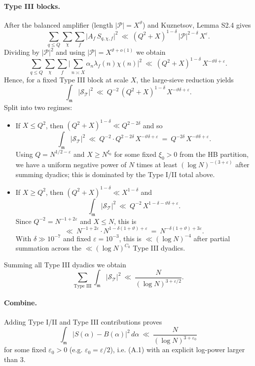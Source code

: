 \documentclass[11pt]{article}
\theoremstyle{definition}
\theoremstyle{remark}
\begin{document}
\paragraph{Type III blocks.} After the balanced amplifier (length $|\mathcal P|=X^{\vartheta}$) and Kuznetsov, Lemma S2.4 gives
\[
	\sum_{q\le Q}\sum_{\chi}\sum_f\big|A_f\,S_{q,\chi,f}\big|^2\ \ll\ (Q^2+X)^{1-\delta}\,|\mathcal P|^{2-\delta}\,X^{\varepsilon}.
\]
Dividing by $|\mathcal P|^2$ and using $|\mathcal P|=X^{\vartheta+o(1)}$ we obtain
\[
	\sum_{q\le Q}\sum_{\chi}\sum_f\Big|\sum_{n\asymp X}\alpha_n\lambda_f(n)\chi(n)\Big|^2\ \ll\ (Q^2+X)^{1-\delta}\,X^{-\vartheta\delta+\varepsilon}.
\]
Hence, for a fixed Type III block at scale $X$, the large-sieve reduction yields
\[
	\int_{\mathfrak m}|\mathcal S_{\mathcal T}|^2\ \ll\ Q^{-2}\,(Q^2+X)^{1-\delta}\,X^{-\vartheta\delta+\varepsilon}.
\]
Split into two regimes:
\begin{itemize}
	\item If $X\le Q^2$, then $(Q^2+X)^{1-\delta}\ll Q^{2-2\delta}$ and so
	      \[
		      \int_{\mathfrak m}|\mathcal S_{\mathcal T}|^2\ \ll\ Q^{-2}\cdot Q^{2-2\delta}\,X^{-\vartheta\delta+\varepsilon}\ =\ Q^{-2\delta}\,X^{-\vartheta\delta+\varepsilon}.
	      \]
	      Using $Q=N^{1/2-\varepsilon}$ and $X\ge N^{\xi_0}$ for some fixed $\xi_0>0$ from the HB partition, we have a uniform negative power of $N$ times at least $(\log N)^{-(3+\varepsilon)}$ after summing dyadics; this is dominated by the Type I/II total above.
	\item If $X\ge Q^2$, then $(Q^2+X)^{1-\delta}\ll X^{1-\delta}$ and
	      \[
		      \int_{\mathfrak m}|\mathcal S_{\mathcal T}|^2\ \ll\ Q^{-2}\,X^{1-\delta-\vartheta\delta+\varepsilon}.
	      \]
	      Since $Q^{-2}=N^{-1+2\varepsilon}$ and $X\le N$, this is
	      \[
		      \ll\ N^{-1+2\varepsilon}\cdot N^{1-\delta(1+\vartheta)+\varepsilon}\ =\ N^{-\delta(1+\vartheta)+3\varepsilon}.
	      \]
	      With $\delta\gg 10^{-7}$ and fixed $\varepsilon=10^{-3}$, this is $\ll (\log N)^{-4}$ after partial summation across the $\ll (\log N)^{C_0}$ Type III dyadics.
\end{itemize}
Summing all Type III dyadics we obtain
\[
	\sum_{\text{Type III}}\int_{\mathfrak m}|\mathcal S_{\mathcal T}|^2\ \ll\ \frac{N}{(\log N)^{3+\varepsilon/2}}.
\]

\paragraph{Combine.} Adding Type I/II and Type III contributions proves
\[
	\int_{\mathfrak m}|S(\alpha)-B(\alpha)|^2\,d\alpha\ \ll\ \frac{N}{(\log N)^{3+\varepsilon_0}}
\]
for some fixed $\varepsilon_0>0$ (e.g. $\varepsilon_0=\varepsilon/2$), i.e. (A.1) with an explicit log-power larger than $3$.
\end{document}
